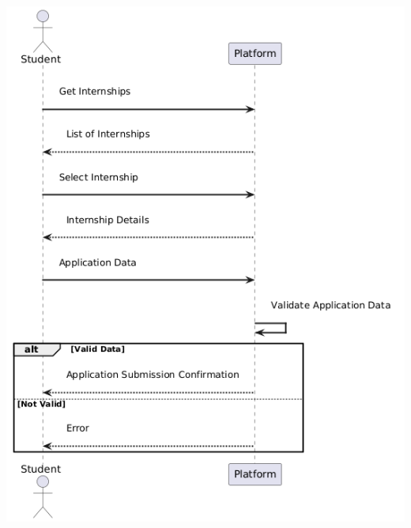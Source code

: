 \begin{center}
    \includegraphics[scale = 0.8]{Images/ImagesRASD/Student_application.png}
\end{center}

\newpage
